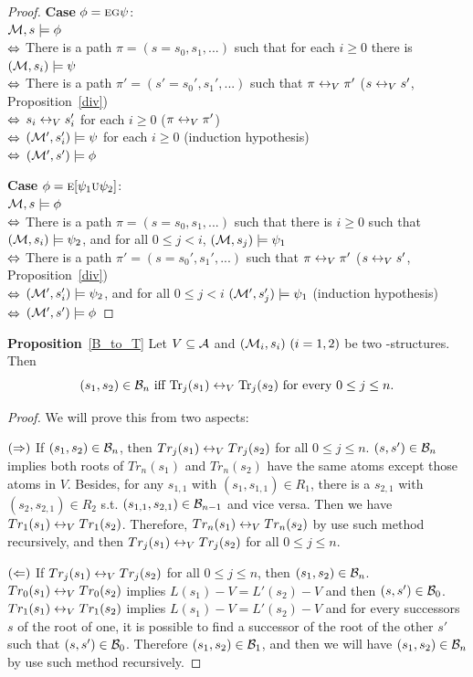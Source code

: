 \documentclass[letterpaper]{article} %
\begin{document}
\begin{proof}
\textbf{Case} $\phi = \textsc{e} \textsc{g} \psi$:\\
${\cal M}, s \models \phi$ \\
$\Leftrightarrow$ There is a path $\pi =(s=s_0, s_1, ...)$ such that for each $i \geq 0$ there is $({\cal M}, s_i) \models \psi$\\
$\Leftrightarrow$ There is a path $\pi' = (s'=s_0', s_1', ...)$ such that $\pi \leftrightarrow_V \pi'$   \hfill ($s \leftrightarrow_V s'$, Proposition~\ref{div})\\
$\Leftrightarrow$ $s_i \leftrightarrow_V s_i'$ for each $i \geq 0$ \hfill ($\pi \leftrightarrow_V \pi'$)\\
$\Leftrightarrow$ $({\cal M}', s_i') \models \psi$ for each $i \geq 0$  \hfill  (induction hypothesis)\\
$\Leftrightarrow$ $({\cal M}', s') \models \phi$

\textbf{Case} $\phi = \textsc{e} [\psi_1 \textsc{u} \psi_2]$:\\
${\cal M}, s \models \phi$ \\
$\Leftrightarrow$ There is a path $\pi= (s=s_0, s_1, ...)$ such that there is $i \geq 0$ such that $({\cal M}, s_i) \models \psi_2$, and for all $0 \leq j < i$, $({\cal M}, s_j) \models \psi_1$\\
$\Leftrightarrow$ There is a path $\pi' = (s=s_0', s_1', ...)$ such that $\pi \leftrightarrow_V \pi'$  \hfill  ($s \leftrightarrow_V s'$, Proposition~\ref{div})\\
$\Leftrightarrow$ $({\cal M}', s_i') \models \psi_2$, and for all $0 \leq j < i$ $({\cal M}', s_j') \models \psi_1$   \hfill   (induction hypothesis)\\
$\Leftrightarrow$ $({\cal M}', s') \models \phi$
\end{proof}


\noindent\textbf{Proposition}~\ref{B_to_T}  Let $V\subseteq\cal A$ and $({\cal M}_i,s_i)~(i=1,2)$ be two \MPK-structures.
  Then
  \[(s_1,s_2)\in{\cal B}_n\mbox{ iff }
  \textrm{Tr}_j(s_1)\leftrightarrow_V\textrm{Tr}_j(s_2)\mbox{ for every $0\le j\le n$}.\]
\begin{proof}
We will prove this from two aspects:

$(\Rightarrow)$ If $(s_1, s_2) \in {\cal B}_n$, then $Tr_j(s_1) \leftrightarrow_V Tr_j(s_2)$ for all $0 \leq j \leq n$. $(s, s') \in {\cal B}_n$ implies both roots of $Tr_n(s_1)$ and $Tr_n(s_2)$ have the same atoms except those atoms in $V$.
Besides, for any $s_{1,1}$ with $(s_1, s_{1,1}) \in R_1$, there is a $s_{2,1}$ with $(s_2, s_{2,1})\in R_2$ s.t. $(s_{1,1}, s_{2,1}) \in {\cal B}_{n-1}$ and vice versa.
Then we have $Tr_1(s_1) \leftrightarrow_V Tr_1(s_2)$.
Therefore,  $Tr_n(s_1) \leftrightarrow_V Tr_n(s_2)$ by use such method recursively, and then $Tr_j(s_1) \leftrightarrow_V Tr_j(s_2)$ for all $0 \leq j \leq n$.

$(\Leftarrow)$ If $Tr_j(s_1) \leftrightarrow_V Tr_j(s_2)$ for all $0\leq j \leq n$, then $(s_1, s_2) \in {\cal B}_n$.
$Tr_0(s_1) \leftrightarrow_V Tr_0(s_2)$ implies $L(s_1) - V = L'(s_2) - V$ and then $(s, s') \in {\cal B}_0$.
$Tr_1(s_1) \leftrightarrow_V Tr_1(s_2)$ implies $L(s_1) - V = L'(s_2)- V$ and for every successors $s$ of the root of one, it is possible to find a successor of the root of the other $s'$ such that
$(s, s')\in {\cal B}_0$. Therefore $(s_1, s_2) \in {\cal B}_1$, and then we will have $(s_1, s_2) \in {\cal B}_n$ by use such method recursively.
\end{proof}
\end{document}
